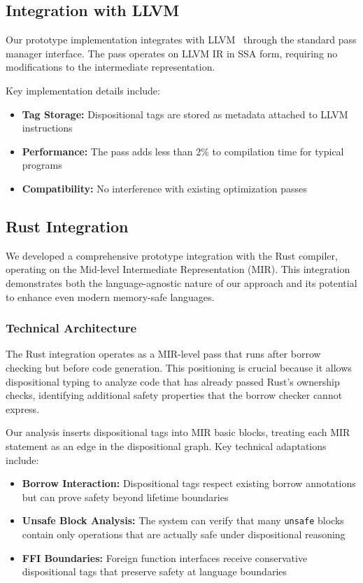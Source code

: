 \documentclass[journal]{IEEEtran}
\begin{document}
\subsection{Integration with LLVM}

Our prototype implementation integrates with LLVM~\cite{lattner2004llvm} through the standard pass manager interface. The pass operates on LLVM IR in SSA form, requiring no modifications to the intermediate representation.

Key implementation details include:

\begin{itemize}
\item \textbf{Tag Storage:} Dispositional tags are stored as metadata attached to LLVM instructions
\item \textbf{Performance:} The pass adds less than 2\% to compilation time for typical programs
\item \textbf{Compatibility:} No interference with existing optimization passes
\end{itemize}

\subsection{Rust Integration}

We developed a comprehensive prototype integration with the Rust compiler, operating on the Mid-level Intermediate Representation (MIR). This integration demonstrates both the language-agnostic nature of our approach and its potential to enhance even modern memory-safe languages.

\subsubsection{Technical Architecture}

The Rust integration operates as a MIR-level pass that runs after borrow checking but before code generation. This positioning is crucial because it allows dispositional typing to analyze code that has already passed Rust's ownership checks, identifying additional safety properties that the borrow checker cannot express.

Our analysis inserts dispositional tags into MIR basic blocks, treating each MIR statement as an edge in the dispositional graph. Key technical adaptations include:

\begin{itemize}
\item \textbf{Borrow Interaction:} Dispositional tags respect existing borrow annotations but can prove safety beyond lifetime boundaries
\item \textbf{Unsafe Block Analysis:} The system can verify that many \texttt{unsafe} blocks contain only operations that are actually safe under dispositional reasoning
\item \textbf{FFI Boundaries:} Foreign function interfaces receive conservative dispositional tags that preserve safety at language boundaries
\end{itemize}
\end{document}
